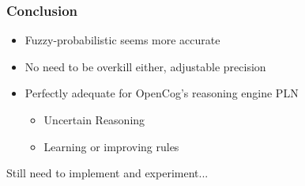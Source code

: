 \documentclass{beamer}
\begin{document}
\frame
{
  \frametitle{Conclusion}
  \begin{itemize}
  \item Fuzzy-probabilistic seems \alert{more accurate}
  \item No need to be overkill either, \alert{adjustable precision}
  \item Perfectly \alert{adequate for OpenCog}'s reasoning engine PLN
    \begin{itemize}
    \item Uncertain Reasoning
    \item Learning or improving rules
    \end{itemize}
  \end{itemize}
  Still need to implement and experiment...
}
\end{document}
